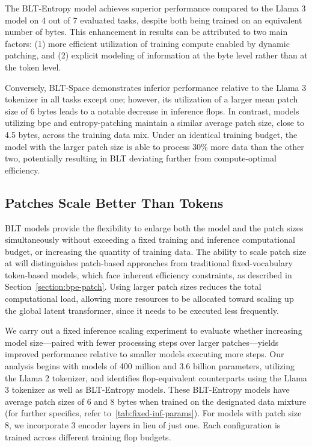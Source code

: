 The {\textsc BLT}-Entropy model achieves superior performance compared to the Llama 3 model on 4 out of 7 evaluated tasks, despite both being trained on an equivalent number of bytes. This enhancement in results can be attributed to two main factors: (1) more efficient utilization of training compute enabled by dynamic patching, and (2) explicit modeling of information at the byte level rather than at the token level.

Conversely, {\textsc BLT}-Space demonstrates inferior performance relative to the Llama 3 tokenizer in all tasks except one; however, its utilization of a larger mean patch size of 6 bytes leads to a notable decrease in inference flops. In contrast, models utilizing bpe and entropy-patching maintain a similar average patch size, close to 4.5 bytes, across the training data mix. Under an identical training budget, the model with the larger patch size is able to process 30\% more data than the other two, potentially resulting in {\textsc BLT} deviating further from compute-optimal efficiency.

\subsection{Patches Scale Better Than Tokens} {\textsc BLT} models provide the flexibility to enlarge both the model and the patch sizes simultaneously without exceeding a fixed training and inference computational budget, or increasing the quantity of training data. The ability to scale patch size at will distinguishes patch-based approaches from traditional fixed-vocabulary token-based models, which face inherent efficiency constraints, as described in Section~\ref{section:bpe-patch}. Using larger patch sizes reduces the total computational load, allowing more resources to be allocated toward scaling up the global latent transformer, since it needs to be executed less frequently.

We carry out a fixed inference scaling experiment to evaluate whether increasing model size—paired with fewer processing steps over larger patches—yields improved performance relative to smaller models executing more steps. Our analysis begins with models of 400 million and 3.6 billion parameters, utilizing the Llama 2 tokenizer, and identifies flop-equivalent counterparts using the Llama 3 tokenizer as well as {\textsc BLT}-Entropy models. These {\textsc BLT}-Entropy models have average patch sizes of 6 and 8 bytes when trained on the designated data mixture (for further specifics, refer to~\autoref{tab:fixed-inf-params}). For models with patch size 8, we incorporate 3 encoder layers in lieu of just one. Each configuration is trained across different training flop budgets.

